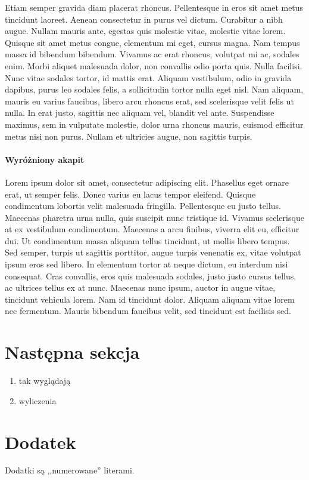 \documentclass[10pt,a4paper,titlepage,twocolumn]{article}
\begin{document}
Etiam semper gravida diam placerat rhoncus. Pellentesque in eros sit amet metus
tincidunt laoreet. Aenean consectetur in purus vel dictum. Curabitur a nibh
augue. Nullam mauris ante, egestas quis molestie vitae, molestie vitae lorem.
Quisque sit amet metus congue, elementum mi eget, cursus magna. Nam tempus massa
id bibendum bibendum. Vivamus ac erat rhoncus, volutpat mi ac, sodales enim.
Morbi aliquet malesuada dolor, non convallis odio porta quis. Nulla facilisi.
Nunc vitae sodales tortor, id mattis erat. Aliquam vestibulum, odio in gravida
dapibus, purus leo sodales felis, a sollicitudin tortor nulla eget nisl. Nam
aliquam, mauris eu varius faucibus, libero arcu rhoncus erat, sed scelerisque
velit felis ut nulla. In erat justo, sagittis nec aliquam vel, blandit vel
ante. Suspendisse maximus, sem in vulputate molestie, dolor urna rhoncus
mauris, euismod efficitur metus nisi non purus. Nullam et ultricies augue, non
sagittis turpis.

\paragraph{Wyróżniony akapit}
Lorem ipsum dolor sit amet, consectetur adipiscing elit. Phasellus eget ornare
erat, ut semper felis. Donec varius eu lacus tempor eleifend. Quisque
condimentum lobortis velit malesuada fringilla. Pellentesque eu justo tellus.
Maecenas pharetra urna nulla, quis suscipit nunc tristique id. Vivamus
scelerisque at ex vestibulum condimentum. Maecenas a arcu finibus, viverra elit
eu, efficitur dui. Ut condimentum massa aliquam tellus tincidunt, ut mollis
libero tempus. Sed semper, turpis ut sagittis porttitor, augue turpis venenatis
ex, vitae volutpat ipsum eros sed libero. In elementum tortor at neque dictum,
eu interdum nisi consequat. Cras convallis, eros quis malesuada sodales, justo
justo cursus tellus, ac ultrices tellus ex at nunc. Maecenas nunc ipsum, auctor
in augue vitae, tincidunt vehicula lorem. Nam id tincidunt dolor. Aliquam
aliquam vitae lorem nec fermentum. Mauris bibendum faucibus velit, sed tincidunt
est facilisis sed.

\section{Następna sekcja}

\begin{enumerate}
    \item tak wyglądają
    \item wyliczenia
\end{enumerate}

\appendix

\section{Dodatek}

Dodatki są ,,numerowane'' literami.
\end{document}
